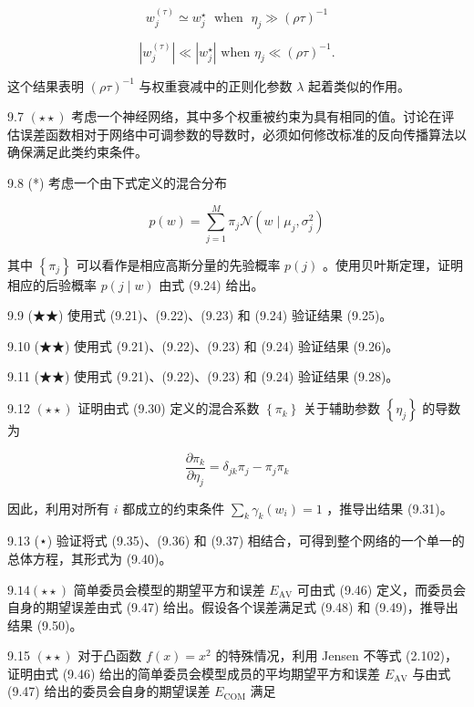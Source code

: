 \documentclass[10pt]{report}
\begin{document}
\[
{w}_{j}^{\left( \tau \right) } \simeq  {w}_{j}^{ \star  }\;\text{ when }\;{\eta }_{j} \gg  {\left( \rho \tau \right) }^{-1} \tag{9.60}
\]

\[
\left| {w}_{j}^{\left( \tau \right) }\right|  \ll  \left| {w}_{j}^{ \star  }\right| \text{ when }{\eta }_{j} \ll  {\left( \rho \tau \right) }^{-1}. \tag{9.61}
\]

这个结果表明 \({\left( \rho \tau \right) }^{-1}\) 与权重衰减中的正则化参数 \(\lambda\) 起着类似的作用。

9.7 \(\left( {\star  \star  }\right)\) 考虑一个神经网络，其中多个权重被约束为具有相同的值。讨论在评估误差函数相对于网络中可调参数的导数时，必须如何修改标准的反向传播算法以确保满足此类约束条件。

9.8 (*) 考虑一个由下式定义的混合分布

\[
p\left( w\right)  = \mathop{\sum }\limits_{{j = 1}}^{M}{\pi }_{j}\mathcal{N}\left( {w \mid  {\mu }_{j},{\sigma }_{j}^{2}}\right)  \tag{9.62}
\]

其中 \(\left\{  {\pi }_{j}\right\}\) 可以看作是相应高斯分量的先验概率 \(p\left( j\right)\) 。使用贝叶斯定理，证明相应的后验概率 \(p\left( {j \mid  w}\right)\) 由式 (9.24) 给出。

9.9 (★★) 使用式 (9.21)、(9.22)、(9.23) 和 (9.24) 验证结果 (9.25)。

9.10 (★★) 使用式 (9.21)、(9.22)、(9.23) 和 (9.24) 验证结果 (9.26)。

9.11 (★★) 使用式 (9.21)、(9.22)、(9.23) 和 (9.24) 验证结果 (9.28)。

9.12 \(\left( {\star  \star  }\right)\) 证明由式 (9.30) 定义的混合系数 \(\left\{  {\pi }_{k}\right\}\) 关于辅助参数 \(\left\{  {\eta }_{j}\right\}\) 的导数为

\[
\frac{\partial {\pi }_{k}}{\partial {\eta }_{j}} = {\delta }_{jk}{\pi }_{j} - {\pi }_{j}{\pi }_{k} \tag{9.63}
\]

因此，利用对所有 \(i\) 都成立的约束条件 \(\mathop{\sum }\limits_{k}{\gamma }_{k}\left( {w}_{i}\right)  = 1\) ，推导出结果 (9.31)。

9.13 (⋆) 验证将式 (9.35)、(9.36) 和 (9.37) 相结合，可得到整个网络的一个单一的总体方程，其形式为 (9.40)。

\({9.14}\left( {\star  \star  }\right)\) 简单委员会模型的期望平方和误差 \({E}_{\mathrm{{AV}}}\) 可由式 (9.46) 定义，而委员会自身的期望误差由式 (9.47) 给出。假设各个误差满足式 (9.48) 和 (9.49)，推导出结果 (9.50)。

9.15 \(\left( {\star  \star  }\right)\) 对于凸函数 \(f\left( x\right)  = {x}^{2}\) 的特殊情况，利用 Jensen 不等式 (2.102)，证明由式 (9.46) 给出的简单委员会模型成员的平均期望平方和误差 \({E}_{\mathrm{{AV}}}\) 与由式 (9.47) 给出的委员会自身的期望误差 \({E}_{\mathrm{{COM}}}\) 满足
\end{document}
